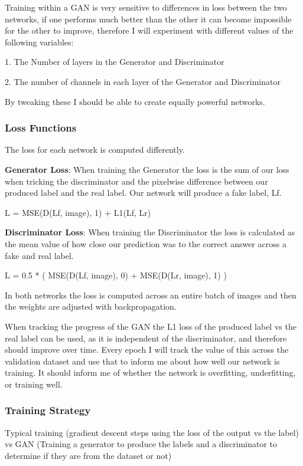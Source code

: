 \documentclass[11pt]{article}
\begin{document}
Training within a GAN is very sensitive to differences in loss between the two networks, if one performs much better than the other it can become impossible for the other to improve, therefore I will experiment with different values of the following variables:

1. The Number of layers in the Generator and Discriminator

2. The number of channels in each layer of the Generator and Discriminator

By tweaking these I should be able to create equally powerful networks. 

\subsubsection{Loss Functions}

The loss for each network is computed differently.

\textbf{Generator Loss}: When training the Generator the loss is the sum of our loss when tricking the discriminator and the pixelwise difference between our produced label and the real label. Our network will produce a fake label, Lf. 

L = MSE(D(Lf, image), 1) + L1(Lf, Lr) 

\textbf{Discriminator Loss}: When training the Discriminator the loss is calculated as the mean value of how close our prediction was to the correct answer across a fake and real label.

L = 0.5 * ( MSE(D(Lf, image), 0) + MSE(D(Lr, image), 1) ) 

In both networks the loss is computed across an entire batch of images and then the weights are adjusted with backpropagation.

When tracking the progress of the GAN the L1 loss of the produced label vs the real label can be used, as it is independent of the discriminator, and therefore should improve over time. Every epoch I will track the value of this across the validation dataset and use that to inform me about how well our network is training. It should inform me of whether the network is overfitting, underfitting, or training well. 

\subsubsection{Training Strategy}

Typical training (gradient descent steps using the loss of the output vs the label) vs GAN (Training a generator to produce the labels and a discriminator to determine if they are from the dataset or not)
\end{document}
